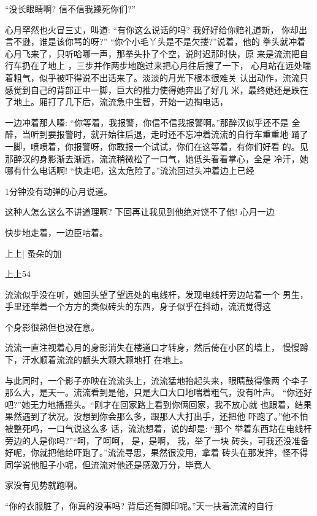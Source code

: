 \documentclass{article}
\begin{document}
“没长眼睛啊? 信不信我躁死你们?” 

心月罕然也火冒三丈，叫道: “有你这么说话的吗? 我好好给你赔礼道新，
你却出言不逊，谁是该你骂的呀?” “你个小毛丫头是不是欠搂?”说着，他的
拳头就冲着心月飞来了，只听哈哪一声，那拳头扑了个空，说时迟那时快，原
来是流流把自行车扔在了地上 ，三步并作两步地跑过来把心月往后搜了一下，
心月站在远处喘着粗气，似乎被吓得说不出话来了。淡淡的月光下根本很难关
认出动作，流流只感觉到自己的背部正中一脚，巨大的推力使得她奔出了好几
米，最终她还是跌在了地上。厢打了几下后，流流急中生智，开始一边掏电话，
\newpage

一边冲着那人嗪: “你等着，我报警，你信不信我报警啊。”那醉汉似乎还不是
全醉，当听到要报警时，就开始往后退，走时还不忘冲着流流的自行车重重地
踊了一脚，喷喷着，你报警呀，你敢报一个试试，你们在这等着，有你们好看
的。见那醉汉的身影渐去渐远，流流稍微松了一口气，她低头看看掌心，全是
冷汗，她哪有什么电话啊! “快走吧，这太危险了。”流流回过头冲着边上已经

1分钟没有动弹的心月说道。 

这种人怎么这么不讲道理啊? 下回再让我见到他绝对饶不了他! 心月一边

快步地走着，一边臣咕着。 




上上|   蚤朵的加 


\newpage

上上54 

流流似乎没在听，她回头望了望远处的电线杆，发现电线杆旁边站着一个
男生，手里还举着一个方方的类似砖头的东西，身子似乎在抖动，流流觉得这

个身影很熟但也没在意。 

流流一直注视着心月的身影消失在楼道口才转身，然后倚在小区的墙上，
慢慢蹲下，汗水顺着流流的额头大颗大颗地打
在地上。 

与此同时，一个影子亦映在流流头上，流流猛地抬起头来，眼睛鼓得像两
个李子那么大，是天一。流流看到是他，只是大口大口地喘着粗气，没有叶声。
“你还好吧?”她无力地播摇头。“刚才在回家路上看到你俩回家，我不放心就
也跟着，结果果然遇到了状况。没想到你会那么多，跟那人大打出手，还把他
吓跑了。”他不怕被整死吗，一口气说这么多
\newpage
话，流流想着，说的却是: “那个
举着东西站在电线杆旁边的人是你吗?”“呵，了呵呵， 是，是啊， 我，举了一块
砖头，可我还没准备好呢，你就把他给吓跑了。”流流寻思，果然很没用，拿着
砖头在那发拌，怪不得同学说他胆子小呢，但流流对他还是感激万分，毕竟人

家没有见势就跑啊。 

“你的衣服脏了，你真的没事吗? 背后还有脚印呢。”天一扶着流流的自行
\end{document}
